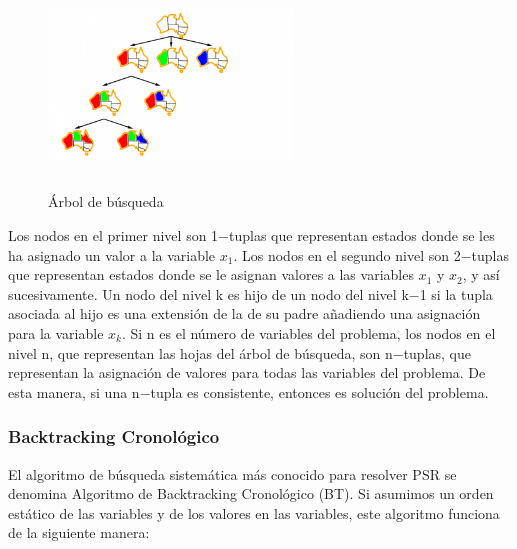 \documentclass[a4paper]{article}
\begin{document}
\begin{figure}
	\centering
	\includegraphics[width=6.5cm,height=5.5cm]{psr-tree.png}
	\caption{Árbol de búsqueda}
	\label{fig:myfig}
\end{figure}


Los nodos en el primer nivel son 1−tuplas que representan estados donde se les ha asignado un valor a la variable $x_1$. Los nodos en el segundo nivel son 2−tuplas que representan estados donde se le asignan valores a las variables $x_1$ y $x_2$, y así sucesivamente. Un nodo del nivel k es hijo de un nodo del nivel k−1 si la tupla asociada al hijo es una extensión de la de su padre añadiendo una asignación para la variable $x_k$. Si n es el número de variables del problema, los nodos en el nivel n, que representan las hojas del árbol de búsqueda, son n−tuplas, que representan la asignación de valores para todas las variables del problema. De esta manera, si una n−tupla es consistente, entonces es solución del problema.


\subsubsection*{Backtracking Cronológico}

El algoritmo de búsqueda sistemática más conocido para resolver PSR se denomina Algoritmo de Backtracking Cronológico (BT). Si asumimos un orden estático de las variables y de los valores en las variables, este algoritmo funciona de la siguiente manera:
\end{document}
